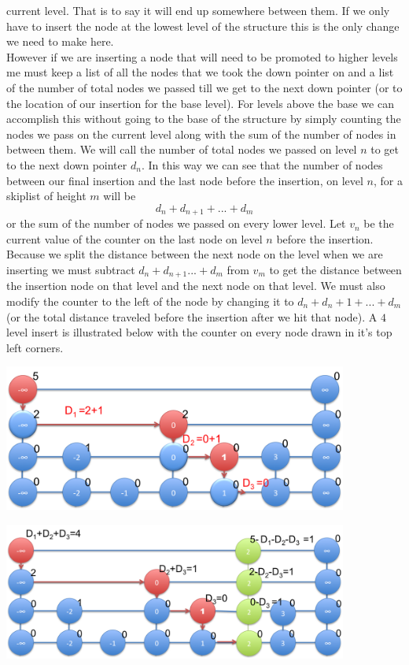 \documentclass[11pt]{article}
\begin{document}
\begin{enumerate}
\begin{description}
			current level. That is to say it will end up
			somewhere between them.	If we only have to insert the node at the lowest level of the
			structure this is the only change we need to make
			here.\\
			However if we are inserting a node that will need to be
			promoted to higher levels me must keep a list of all 
				the nodes that we took the down pointer on
				and a list of the number of total
				nodes we passed till we get to the next down
				pointer (or to the location of our
				insertion for the base level). For levels above
				the base
				we can accomplish this without going to the base of
				the structure by simply counting the nodes we pass
				on the current level along with the sum of the
				number of nodes in between them.
			We will call the number of total nodes we passed on level $n$ to get
				to the next down pointer $d_n$.
				In this way we can see that the number of nodes
				between our final insertion and the last node 
				before the insertion, on level $n$, for a
				skiplist of height $m$ will be
				$$d_n + d_{n+1}+...+d_m$$
				or the sum of the number of nodes we
				passed on every lower level.
			Let $v_n$ be the current value of the counter 
				on the last node on level $n$ before the
				insertion.
			Because we split the distance between the next node on
				the level when we are inserting we must subtract
				$d_n + d_{n+1} ...+ d_m$ from $v_m$ to get the
				distance between the 
				insertion node on that level and the next node
				on that level.
				We must also modify the counter to the left of
				the node by changing it to $d_n + d_n+1 + ...+
				d_m$ (or the total distance traveled before the
				insertion after we hit that node).
		A $4$ level insert is illustrated below with the counter on
				every node drawn in it's top left corners. 
		\begin{center}
		\includegraphics[width=0.85\textwidth]{images/sl1}
		\end{center}
		\begin{center}
		\includegraphics[width=0.85\textwidth]{images/sl2}
		\end{center}


\end{description}
\end{enumerate}
\end{document}
